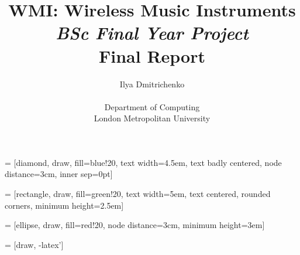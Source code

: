 \newcommand{\TEP}[1]{\AltRef{\emph{TEP#1}}{http://www.tinyos.net/tinyos-2.x/doc/pdf/tep#1.pdf}{links:tinyos:tep#1}}



\newcommand{\MAN}[1]{\AltRef{\emph{\texttt{#1}}}{http://manpages.debian.net/cgi-bin/man.cgi?query=#1&sektion=0&format=ascii}{doc:linux:man:0:#1}}
\newcommand{\MANX}[2]{\AltRef{\emph{\texttt{#2}}}{http://manpages.debian.net/cgi-bin/man.cgi?query=#2&sektion=#1&format=ascii}{doc:linux:man:#1:#2}}


\newcommand{\Blob}[1]{\Href{https://github.com/errordeveloper/contiki-wmi/blob/wmi-work/#1}{\texttt{#1}}}
\newcommand{\Tree}[1]{\Href{https://github.com/errordeveloper/contiki-wmi/tree/wmi-work/#1}{\texttt{#1}}}
\newcommand{\Blame}[1]{\Href{https://github.com/errordeveloper/contiki-wmi/blame/wmi-work/#1}{\texttt{#1}}}
\newcommand{\Logs}[1]{\Href{https://github.com/errordeveloper/contiki-wmi/commits/wmi-work/#1}{\texttt{#1}}}
\newcommand{\Contrib}[1]{\Href{https://github.com/errordeveloper/contiki-wmi/commits/wmi-work/#1?author=errordeveloper}{\texttt{#1}}}

\usepackage{tikz}
\usetikzlibrary{automata,positioning,shapes,arrows}

 = [diamond,
			draw, fill=blue!20,
			text width=4.5em, text badly centered,
			node distance=3cm, inner sep=0pt]

 = [rectangle,
			draw, fill=green!20,
			text width=5em, text centered,
			rounded corners, minimum height=2.5em]

 = [ellipse,
			draw, fill=red!20,
			node distance=3cm, minimum height=3em]

 = [draw, -latex']

\usepackage{pstricks-add}


\title{WMI: Wireless Music Instruments\\ \emph{BSc Final Year Project} \\ Final Report}
\author{Ilya Dmitrichenko \\ \\ Department of Computing\\ London Metropolitan University}

